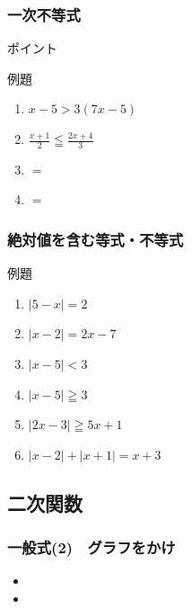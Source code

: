 \documentclass[10pt,dvipdfmx]{jsarticle}
\begin{document}
\subsubsection*{一次不等式}
\begin{itembox}[l]{ポイント}
  \vspace{8mm}

\end{itembox}
\begin{itembox}[l]{例題}
  \begin{large}
    \begin{enumerate}
      \item $x-5>3(7x-5)$
      \item $\frac{x+1}{2}\leqq\frac{2x+4}{3}$
      \item $=$
      \item $=$
    \end{enumerate}
  \end{large}
\end{itembox}

\subsubsection*{絶対値を含む等式・不等式}
\begin{itembox}[l]{例題}
  \begin{large}
    \begin{enumerate}
      \item $|5-x|=2$
      \item $|x-2|=2x-7$
      \item $|x-5|<3$
      \item $|x-5|\geqq3$
      \item $|2x-3|\geqq5x+1$
      \item $|x-2|+|x+1|=x+3$
    \end{enumerate}
  \end{large}
\end{itembox}

\newpage
\subsection*{二次関数}
\subsubsection*{一般式(2)　グラフをかけ}
\begin{large}
  \begin{itemize}
    \item
    \item
  \end{itemize}
\end{large}
\end{document}
